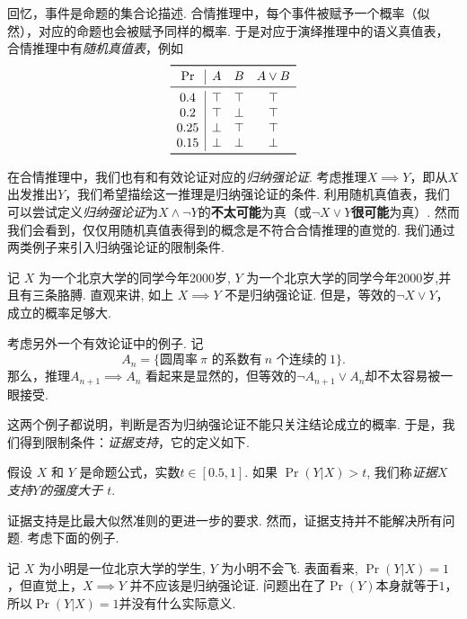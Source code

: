回忆，事件是命题的集合论描述. 合情推理中，每个事件被赋予一个概率（似然），对应的命题也会被赋予同样的概率. 于是对应于演绎推理中的语义真值表，合情推理中有\textit{随机真值表}，例如
\[
\begin{array}{c|ccc}
    \toprule
    \Pr & A & B & A\vee B \\ \midrule
    0.4 & \T & \T & \T \\ 
    0.2 & \T & \F & \T \\ 
    0.25 & \F & \T & \T \\
    0.15 & \F & \F & \F \\
    \bottomrule
\end{array}
\]

在合情推理中，我们也有和有效论证对应的\textit{归纳强论证}. 考虑推理$X\implies Y$，即从$X$出发推出$Y$，我们希望描绘这一推理是归纳强论证的条件. 利用随机真值表，我们可以尝试定义\textit{归纳强论证}为$X\wedge\neg Y$的\textbf{不太可能}为真（或$\neg X\vee Y$\textbf{很可能}为真）. 然而我们会看到，仅仅用随机真值表得到的概念是不符合合情推理的直觉的. 我们通过两类例子来引入归纳强论证的限制条件.



\begin{example}[奇怪的例子一]
记 $X$ 为一个北京大学的同学今年2000岁, $Y$ 为一个北京大学的同学今年2000岁,并且有三条胳膊. 直观来讲, 如上 $X\implies Y$ 不是归纳强论证. 但是，等效的$\neg X\vee Y$，成立的概率足够大.

考虑另外一个有效论证中的例子. 记
\[A_n=\{\text{圆周率}~\pi\text{ 的系数有}~n\text{ 个连续的}~1\}.\]
那么，推理$A_{n+1} \implies A_n$ 看起来是显然的，但等效的$\neg A_{n+1} \vee A_n$却不太容易被一眼接受.
\end{example}
这两个例子都说明，判断是否为归纳强论证不能只关注结论成立的概率. 于是，我们得到限制条件：\textit{证据支持}，它的定义如下. 
\begin{definition}[证据支持]
    假设 $X$ 和 $Y$ 是命题公式，实数$t\in [0.5, 1]$. 如果 $\Pr(Y|X)>t$, 我们称\textit{证据$X$支持$Y$的强度大于 $t$}. 
\end{definition}

证据支持是比最大似然准则的更进一步的要求. 然而，证据支持并不能解决所有问题. 考虑下面的例子.

\begin{example}[奇怪的例子二]
记 $X$ 为小明是一位北京大学的学生, $Y$ 为小明不会飞. 表面看来, $\Pr(Y|X)=1$，但直觉上，$X\implies Y$ 并不应该是归纳强论证. 问题出在了$\Pr(Y)$本身就等于$1$，所以$\Pr(Y|X)=1$并没有什么实际意义.
\end{example}

